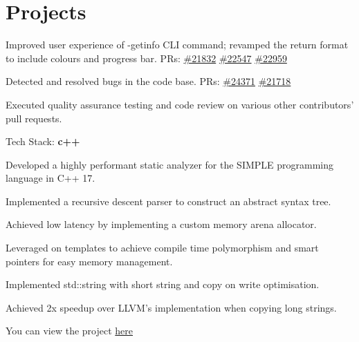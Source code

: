 \documentclass[]{Klement_Resume}
\begin{document}
\begin{minipage}[t]{1\textwidth}
    \section{Projects}
    \begin{tightemize}
    \item Improved user experience of -getinfo CLI command; revamped the return format to include colours and progress bar. PRs: \href{https://github.com/bitcoin/bitcoin/pull/21832}{\#21832} \href{https://github.com/bitcoin/bitcoin/pull/22547}{\#22547} \href{https://github.com/bitcoin/bitcoin/pull/22959}{\#22959}
    \item Detected and resolved bugs in the code base. PRs: \href{https://github.com/bitcoin/bitcoin/pull/24371}{\#24371} \href{https://github.com/bitcoin/bitcoin/pull/21718}{\#21718}
    \item Executed quality assurance testing and code review on various other contributors' pull requests.
    \item Tech Stack: {\bf c++}
    \end{tightemize}
    \sectionsep

    \descript{  }
    \begin{tightemize}
      \item Developed a highly performant static analyzer for the SIMPLE programming language in C++ 17.
      \item Implemented a recursive descent parser to construct an abstract syntax tree.
      \item Achieved low latency by implementing a custom memory arena allocator.
      \item Leveraged on templates to achieve compile time polymorphism and smart pointers for easy memory management.
    \end{tightemize}
    \sectionsep

    \descript{  }
    \begin{tightemize}
      \item Implemented std::string with short string and copy on write optimisation.
      \item Achieved 2x speedup over LLVM's implementation when copying long strings.
      \item You can view the project \href{https://github.com/klementtan/string_cpp}{here}
    \end{tightemize}
    \sectionsep


\end{minipage}
\end{document}
